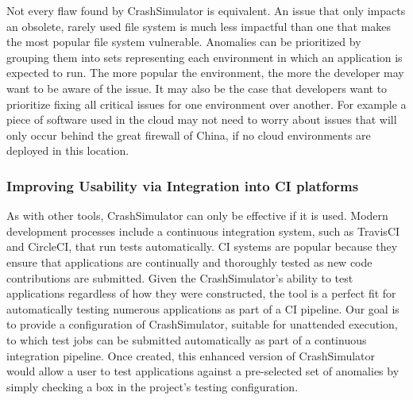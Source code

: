 Not every flaw found by CrashSimulator is equivalent.  An issue that only
impacts an obsolete, rarely used file system is much less impactful than
one that makes the most popular file system vulnerable.
Anomalies
can be prioritized by grouping them into sets representing each
environment in which an application is expected to run. The more popular
the environment, the more the developer may want to be aware of the issue.
It may also be the case that developers want to prioritize fixing all
critical issues for one environment over another.  For example a piece
of software used in the cloud may not need to worry about issues that will only
occur behind the great firewall of China, if no cloud environments are deployed in this location.


%
%

\subsubsection{Improving Usability via Integration into CI platforms}

As with other tools, CrashSimulator can only be effective if it is used.
Modern development processes include a continuous integration system,
such as TravisCI
and CircleCI, that run tests automatically.
CI systems are popular because they
ensure that applications are continually and thoroughly tested as new code
contributions are submitted.  Given the CrashSimulator's ability to test
applications regardless of how they were constructed,
the tool is a perfect fit for
automatically testing numerous applications as part of a CI pipeline.
Our goal is to provide a configuration of CrashSimulator,
suitable for unattended execution, to which test jobs can be submitted
automatically as part of a continuous integration pipeline.  Once created,
this enhanced version of CrashSimulator would allow a user to test
applications against
a pre-selected set of anomalies by simply checking a box in the project's
testing configuration.

